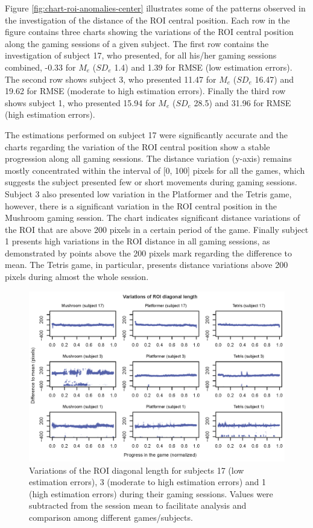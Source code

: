 Figure \ref{fig:chart-roi-anomalies-center} illustrates some of the patterns observed in the investigation of the distance of the ROI central position. Each row in the figure contains three charts showing the variations of the ROI central position along the gaming sessions of a given subject. The first row contains the investigation of subject 17, who presented, for all his/her gaming sessions combined, -0.33 for $M_e$ ($SD_e$ 1.4) and 1.39 for RMSE (low estimation errors). The second row shows subject 3, who presented 11.47 for $M_e$ ($SD_e$ 16.47) and 19.62 for RMSE (moderate to high estimation errors). Finally the third row shows subject 1, who presented 15.94 for $M_e$ ($SD_e$ 28.5) and 31.96 for RMSE (high estimation errors).

The estimations performed on subject 17 were significantly accurate and the charts regarding the variation of the ROI central position show a stable progression along all gaming sessions. The distance variation (y-axis) remains mostly concentrated within the interval of [0, 100] pixels for all the games, which suggests the subject presented few or short movements during gaming sessions. Subject 3 also presented low variation in the Platformer and the Tetris game, however, there is a significant variation in the ROI central position in the Mushroom gaming session. The chart indicates significant distance variations of the ROI that are above 200 pixels in a certain period of the game. Finally subject 1 presents high variations in the ROI distance in all gaming sessions, as demonstrated by points above the 200 pixels mark regarding the difference to mean. The Tetris game, in particular, presents distance variations above 200 pixels during almost the whole session.

\begin{figure}[!h]
\centering
\includegraphics[width=\textwidth]{Content/figures/variation-roi-diagonal.png}
\caption{Variations of the ROI diagonal length for subjects 17 (low estimation errors), 3 (moderate to high estimation errors) and 1 (high estimation errors) during their gaming sessions. Values were subtracted from the session mean to facilitate analysis and comparison among different games/subjects.}
\label{fig:chart-roi-anomalies-diagonal}
\end{figure}

